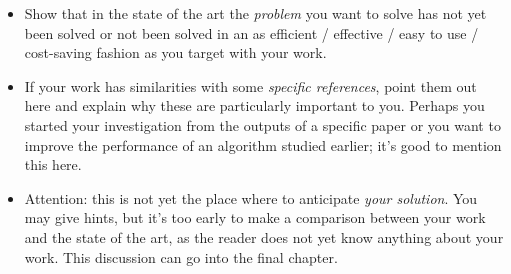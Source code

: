 \begin{itemize}
\item[\Square] Show that in the state of the art the \emph{problem} you want to solve has not yet been solved or not been solved in an as efficient / effective / easy to use / cost-saving fashion as you target with your work.
\item[\Square] If your work has similarities with some \emph{specific references}, point them out here and explain why these are particularly important to you. Perhaps you started your investigation from the outputs of a specific paper or you want to improve the performance of an algorithm studied earlier; it's good to mention this here.
\item[\Square] Attention: this is not yet the place where to anticipate \emph{your solution}. You may give hints, but it's too early to make a comparison between your work and the state of the art, as the reader does not yet know anything about your work. This discussion can go into the final chapter.
\end{itemize}
